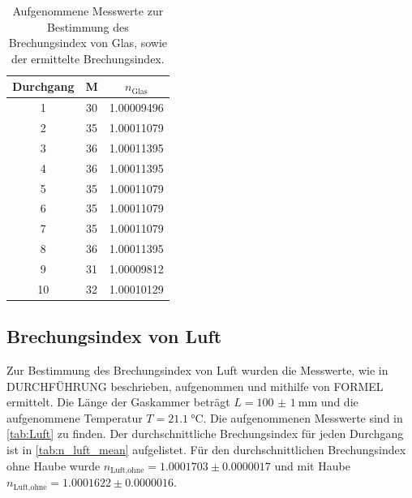 \begin{table}
  \centering
  \caption{Aufgenommene Messwerte zur Bestimmung des Brechungsindex von Glas, sowie der ermittelte Brechungsindex.}
  \label{tab:Glas}
  \begin{tabular}{c c c}
    \toprule
    Durchgang & M & $n_\text{Glas}$ \\
    \midrule
    1    &   30    &   1.00009496\\   
    2    &   35    &   1.00011079\\   
    3    &   36    &   1.00011395\\   
    4    &   36    &   1.00011395\\   
    5    &   35    &   1.00011079\\   
    6    &   35    &   1.00011079\\   
    7    &   35    &   1.00011079\\   
    8    &   36    &   1.00011395\\   
    9    &   31    &   1.00009812\\   
    10   &   32    &   1.00010129\\   
    \bottomrule
  \end{tabular}
\end{table}

\subsection{Brechungsindex von Luft}
\label{subsec:n_Luft}
Zur Bestimmung des Brechungsindex von Luft wurden die Messwerte, wie in DURCHFÜHRUNG beschrieben, aufgenommen und mithilfe von FORMEL ermittelt.
Die Länge der Gaskammer beträgt $L = \SI[separate-uncertainty = true]{100(1)}{\milli\metre}$ \cite{anleitung} und die aufgenommene Temperatur $T = \SI{21.1}{\celsius}$.
Die aufgenommenen Messwerte sind in \ref{tab:Luft} zu finden.
Der durchschnittliche Brechungsindex für jeden Durchgang ist in \ref{tab:n_luft_mean} aufgelistet.
Für den durchschnittlichen Brechungsindex ohne Haube wurde $n_\text{Luft,ohne} = 1.0001703 \pm 0.0000017 $ und mit Haube $n_\text{Luft,ohne} =  1.0001622 \pm 0.0000016 $.

